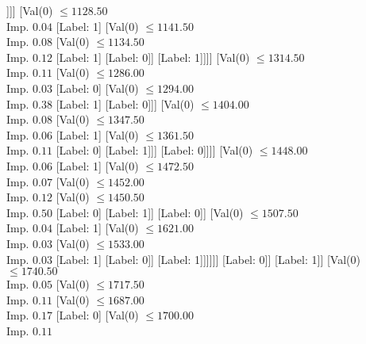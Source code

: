 \documentclass[margin=10pt]{standalone}
\begin{document}
\begin{forest}
																				[Label: 1]
																				[Label: 0]]]]
																	[Val($0$) $ \leq 1128.50$ \\ Imp. $0.04$
																		[Label: 1]
																		[Val($0$) $ \leq 1141.50$ \\ Imp. $0.08$
																			[Val($0$) $ \leq 1134.50$ \\ Imp. $0.12$
																				[Label: 1]
																				[Label: 0]]
																			[Label: 1]]]]
																[Val($0$) $ \leq 1314.50$ \\ Imp. $0.11$
																	[Val($0$) $ \leq 1286.00$ \\ Imp. $0.03$
																		[Label: 0]
																		[Val($0$) $ \leq 1294.00$ \\ Imp. $0.38$
																			[Label: 1]
																			[Label: 0]]]
																	[Val($0$) $ \leq 1404.00$ \\ Imp. $0.08$
																		[Val($0$) $ \leq 1347.50$ \\ Imp. $0.06$
																			[Label: 1]
																			[Val($0$) $ \leq 1361.50$ \\ Imp. $0.11$
																				[Label: 0]
																				[Label: 1]]]
																		[Label: 0]]]]
															[Val($0$) $ \leq 1448.00$ \\ Imp. $0.06$
																[Label: 1]
																[Val($0$) $ \leq 1472.50$ \\ Imp. $0.07$
																	[Val($0$) $ \leq 1452.00$ \\ Imp. $0.12$
																		[Val($0$) $ \leq 1450.50$ \\ Imp. $0.50$
																			[Label: 0]
																			[Label: 1]]
																		[Label: 0]]
																	[Val($0$) $ \leq 1507.50$ \\ Imp. $0.04$
																		[Label: 1]
																		[Val($0$) $ \leq 1621.00$ \\ Imp. $0.03$
																			[Val($0$) $ \leq 1533.00$ \\ Imp. $0.03$
																				[Label: 1]
																				[Label: 0]]
																			[Label: 1]]]]]]
														[Label: 0]]
													[Label: 1]]
												[Val($0$) $ \leq 1740.50$ \\ Imp. $0.05$
													[Val($0$) $ \leq 1717.50$ \\ Imp. $0.11$
														[Val($0$) $ \leq 1687.00$ \\ Imp. $0.17$
															[Label: 0]
															[Val($0$) $ \leq 1700.00$ \\ Imp. $0.11$

\end{forest}
\end{document}
